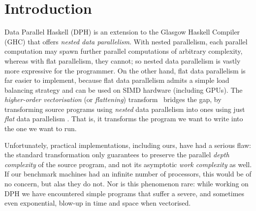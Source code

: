 \section{Introduction}
\label{section:Introduction}

Data Parallel Haskell (DPH) is an extension to the Glasgow Haskell Compiler (GHC) that offers \emph{nested data parallelism}.  With nested parallelism, each parallel computation may spawn further parallel computations of arbitrary complexity, whereas with flat parallelism, they cannot; so nested data parallelism is vastly more expressive for the programmer.  On the other hand, flat data parallelism is far easier to implement, because flat data parallelism admits a simple load balancing strategy and can be used on SIMD hardware (including GPUs). The \emph{higher-order vectorisation} (or \emph {flattening}) transform~\cite{PeytonJones:harnessing-the-multicores} bridges the gap, by transforming source programs using \emph{nested} data parallelism into ones using just \emph{flat} data parallelism \cite{Blelloch:compiling-collection-oriented-languages,PeytonJones:harnessing-the-multicores}. That is, it transforms the program we want to write into the one we want to run.

Unfortunately, practical implementations, including ours, have had a serious flaw: the standard transformation only guarantees to preserve the parallel \emph{depth complexity} of the source program, and not its asymptotic \emph{work complexity} as well. If our benchmark machines had an infinite number of processors, this would be of no concern, but alas they do not.  Nor is this phenomenon rare: while working on DPH we have encountered simple programs that suffer a severe, and sometimes even exponential, blow-up in time and space when vectorised.

